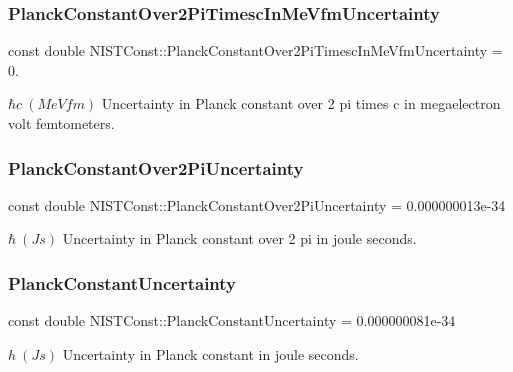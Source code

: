 \subsubsection{\texorpdfstring{Planck\+Constant\+Over2\+Pi\+Timesc\+In\+Me\+Vfm\+Uncertainty}{PlanckConstantOver2PiTimescInMeVfmUncertainty}}
{\footnotesize\ttfamily const double N\+I\+S\+T\+Const\+::\+Planck\+Constant\+Over2\+Pi\+Timesc\+In\+Me\+Vfm\+Uncertainty = 0.}

$\hbar c \ (MeV fm)$ Uncertainty in Planck constant over 2 pi times c in megaelectron volt femtometers. \mbox{\label{group___planck_constant_ga9a87455000578edf387376117fd5bfd8}} 
\subsubsection{\texorpdfstring{Planck\+Constant\+Over2\+Pi\+Uncertainty}{PlanckConstantOver2PiUncertainty}}
{\footnotesize\ttfamily const double N\+I\+S\+T\+Const\+::\+Planck\+Constant\+Over2\+Pi\+Uncertainty = 0.\+000000013e-\/34}

$\hbar \ (J s)$ Uncertainty in Planck constant over 2 pi in joule seconds. \mbox{\label{group___planck_constant_gaf490152b8477c6ead134e42e76753f64}} 
\subsubsection{\texorpdfstring{Planck\+Constant\+Uncertainty}{PlanckConstantUncertainty}}
{\footnotesize\ttfamily const double N\+I\+S\+T\+Const\+::\+Planck\+Constant\+Uncertainty = 0.\+000000081e-\/34}

$h \ (J s)$ Uncertainty in Planck constant in joule seconds. 